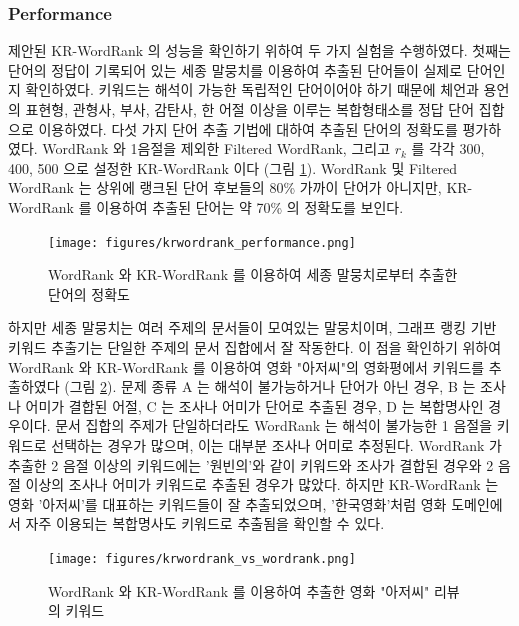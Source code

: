 \documentclass[11pt]{article}
\begin{document}
\subsubsection{Performance}

제안된 KR-WordRank 의 성능을 확인하기 위하여 두 가지 실험을 수행하였다.
첫째는 단어의 정답이 기록되어 있는 세종 말뭉치를 이용하여 추출된 단어들이 실제로 단어인지 확인하였다.
키워드는 해석이 가능한 독립적인 단어이어야 하기 때문에 체언과 용언의 표현형, 관형사, 부사, 감탄사, 한 어절 이상을 이루는 복합형태소를 정답 단어 집합으로 이용하였다.
다섯 가지 단어 추출 기법에 대하여 추출된 단어의 정확도를 평가하였다.
WordRank 와 1음절을 제외한 Filtered WordRank, 그리고 $r_k$ 를 각각 300, 400, 500 으로 설정한 KR-WordRank 이다 (그림 \ref{fig:krwordrank_performance}).
WordRank 및 Filtered WordRank 는 상위에 랭크된 단어 후보들의 80\% 가까이 단어가 아니지만, KR-WordRank 를 이용하여 추출된 단어는 약 70\% 의 정확도를 보인다.

\begin{figure}[H]
\centering
\label{fig:krwordrank_performance}
\texttt{[image: figures/krwordrank\_performance.png]}
\caption{WordRank 와 KR-WordRank 를 이용하여 세종 말뭉치로부터 추출한 단어의 정확도}
\end{figure}

하지만 세종 말뭉치는 여러 주제의 문서들이 모여있는 말뭉치이며, 그래프 랭킹 기반 키워드 추출기는 단일한 주제의 문서 집합에서 잘 작동한다.
이 점을 확인하기 위하여 WordRank 와 KR-WordRank 를 이용하여 영화 "아저씨"의 영화평에서 키워드를 추출하였다 (그림 \ref{fig:krwordrank_vs_wordrank}).
문제 종류 A 는 해석이 불가능하거나 단어가 아닌 경우, B 는 조사나 어미가 결합된 어절, C 는 조사나 어미가 단어로 추출된 경우, D 는 복합명사인 경우이다.
문서 집합의 주제가 단일하더라도 WordRank 는 해석이 불가능한 1 음절을 키워드로 선택하는 경우가 많으며, 이는 대부분 조사나 어미로 추정된다.
WordRank 가 추출한 2 음절 이상의 키워드에는 '원빈의'와 같이 키워드와 조사가 결합된 경우와 2 음절 이상의 조사나 어미가 키워드로 추출된 경우가 많았다.
하지만 KR-WordRank 는 영화 '아저씨'를 대표하는 키워드들이 잘 추출되었으며, '한국영화'처럼 영화 도메인에서 자주 이용되는 복합명사도 키워드로 추출됨을 확인할 수 있다.

\begin{figure}[H]
\centering
\label{fig:krwordrank_vs_wordrank}
\texttt{[image: figures/krwordrank\_vs\_wordrank.png]}
\caption{WordRank 와 KR-WordRank 를 이용하여 추출한 영화 "아저씨" 리뷰의 키워드}
\end{figure}
\end{document}
